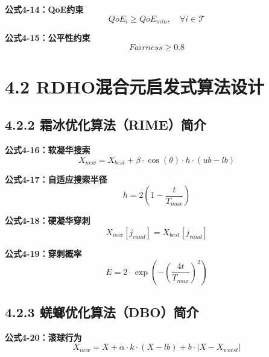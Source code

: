 \documentclass[12pt]{article}
\begin{document}
\textbf{公式4-14：QoE约束}
\begin{equation}
QoE_i \geq QoE_{min}, \quad \forall i \in \mathcal{T}
\end{equation}

\textbf{公式4-15：公平性约束}
\begin{equation}
Fairness \geq 0.8
\end{equation}


\section{4.2 RDHO混合元启发式算法设计}

\subsection{4.2.2 霜冰优化算法（RIME）简介}

\textbf{公式4-16：软凝华搜索}
\begin{equation}
X_{new} = X_{best} + \beta \cdot \cos(\theta) \cdot h \cdot (ub - lb)
\end{equation}

\textbf{公式4-17：自适应搜索半径}
\begin{equation}
h = 2 \left(1 - \frac{t}{T_{max}}\right)
\end{equation}

\textbf{公式4-18：硬凝华穿刺}
\begin{equation}
X_{new}[j_{rand}] = X_{best}[j_{rand}]
\end{equation}

\textbf{公式4-19：穿刺概率}
\begin{equation}
E = 2 \cdot \exp\left(-\left(\frac{4t}{T_{max}}\right)^2\right)
\end{equation}

\subsection{4.2.3 蜣螂优化算法（DBO）简介}

\textbf{公式4-20：滚球行为}
\begin{equation}
X_{new} = X + \alpha \cdot k \cdot (X - lb) + b \cdot |X - X_{worst}|
\end{equation}
\end{document}
